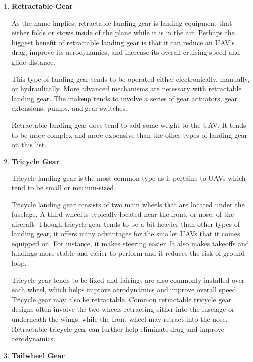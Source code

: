 \documentclass[12 pt]{article}
\begin{document}
{{\begin{enumerate}
While fixed landing gear is simple, easy to maintain, and a cost-effective solution, it does have some notable drawbacks. For instance, the fixed nature of the landing gear creates constant drag, which can restrict aerodynamics and also reduce fuel efficiency.

\item \textbf{Retractable Gear}

As the name implies, retractable landing gear is landing equipment that either folds or stows inside of the plane while it is in the air. Perhaps the biggest benefit of retractable landing gear is that it can reduce an UAV’s drag, improve its aerodynamics, and increase its overall cruising speed and glide distance.

This type of landing gear tends to be operated either electronically, manually, or hydraulically. More advanced mechanisms are necessary with retractable landing gear. The makeup tends to involve a series of gear actuators, gear extensions, pumps, and gear switches.

Retractable landing gear does tend to add some weight to the UAV. It tends to be more complex and more expensive than the other types of landing gear on this list.

\item \textbf{Tricycle Gear}

Tricycle landing gear is the most common type as it pertains to UAVs which tend to be small or medium-sized. 

Tricycle landing gear consists of two main wheels that are located under the fuselage. A third wheel is typically located near the front, or nose, of the aircraft. Though tricycle gear tends to be a bit heavier than other types of landing gear, it offers many advantages for the smaller UAVs that it comes equipped on. For instance, it makes steering easier. It also makes takeoffs and landings more stable and easier to perform and it reduces the risk of ground loop.

Tricycle gear tends to be fixed and fairings are also commonly installed over each wheel, which helps improve aerodynamics and improve overall speed. Tricycle gear may also be retractable. Common retractable tricycle gear designs often involve the two wheels retracting either into the fuselage or underneath the wings, while the front wheel may retract into the nose. Retractable tricycle gear can further help eliminate drag and improve aerodynamics. 

\item \textbf{Tailwheel Gear}


\end{enumerate}}}
\end{document}
